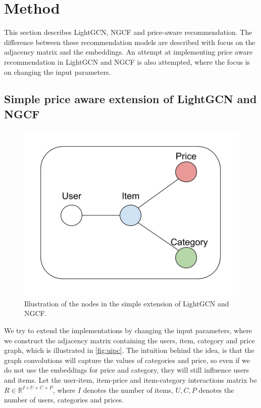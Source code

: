 \section{Method}
This section describes LightGCN, NGCF and price-aware recommendation.
The difference between these recommendation models are described with focus on the adjacency matrix and the embeddings.
An attempt at implementing price aware recommendation in LightGCN and NGCF is also attempted, where the focus is on changing the input parameters.




%
\subsection{Simple price aware extension of LightGCN and NGCF}\label{subsec:simple-extension}
\begin{figure}
    \centering
    \includegraphics[scale=0.5]{figures/uipc.png}
    \caption{Illustration of the nodes in the simple extension of LightGCN and NGCF.}
    \label{fig:uipc}
\end{figure}
We try to extend the implementations by changing the input parameters, where we construct the adjacency matrix containing the users, item, category and price graph, which is illustrated in \autoref{fig:uipc}.
The intuition behind the idea, is that the graph convolutions will capture the values of categories and price, so even if we do not use the embeddings for price and category, they will still influence users and items.
Let the user-item, item-price and item-category interactions matrix be $R \in \mathbb{R}^{I \times U + C + P}$, where $I$ denotes the number of items, $U, C, P$ denotes the number of users, categories and prices.
